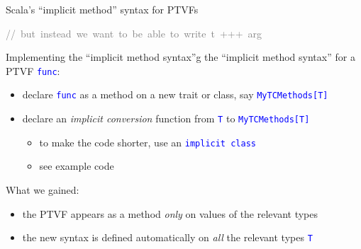 \documentclass[english]{beamer}
\newenvironment{lyxcode}
   {\par\begin{list}{}{
     \setlength{\rightmargin}{\leftmargin}
     \setlength{\listparindent}{0pt}%
     \raggedright
     \setlength{\itemsep}{0pt}
     \setlength{\parsep}{0pt}
     \normalfont\ttfamily}%
    \def\{{\char`\{}
    \def\}{\char`\}}
    \def\textasciitilde{\char`\~}
    \item[]}
   {\end{list}}
\begin{document}
\begin{frame}{Scala's ``implicit method'' syntax for PTVFs}
\begin{lyxcode}
\textrm{\textcolor{gray}{\footnotesize{}//~but~instead~we~want~to~be~able~to~write~}}\textcolor{gray}{\footnotesize{}t~+++~arg}{\footnotesize \par}
\end{lyxcode}
Implementing the ``implicit method syntax''g the ``implicit method syntax'' for a PTVF \texttt{\textcolor{blue}{\footnotesize{}func}}:
\begin{itemize}
\item declare \texttt{\textcolor{blue}{\footnotesize{}func}} as a method
on a new trait or class, say \texttt{\textcolor{blue}{\footnotesize{}MyTCMethods{[}T{]}}}{\footnotesize \par}
\item declare an \emph{implicit conversion }function from \texttt{\textcolor{blue}{\footnotesize{}T}}
to \texttt{\textcolor{blue}{\footnotesize{}MyTCMethods{[}T{]}}}{\footnotesize \par}
\begin{itemize}
\item to make the code shorter, use an \texttt{\textcolor{blue}{\footnotesize{}implicit
class}}{\footnotesize \par}
\item see example code
\end{itemize}
\end{itemize}
What we gained:
\begin{itemize}
\item the PTVF appears as a method \emph{only} on values of the relevant
types
\item the new syntax is defined automatically on \emph{all} the relevant
types \texttt{\textcolor{blue}{\footnotesize{}T}}{\footnotesize \par}
\end{itemize}
\end{frame}
\end{document}
